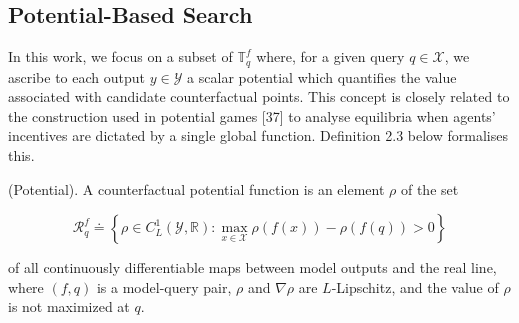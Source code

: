 \subsection*{Potential-Based Search}
In this work, we focus on a subset of $\mathbb{T}_{q}^{f}$ where, for a given query $q \in \mathcal{X}$, we ascribe to each output $y \in \mathcal{Y}$ a scalar potential which quantifies the value associated with candidate counterfactual points. This concept is closely related to the construction used in potential games [37] to analyse equilibria when agents' incentives are dictated by a single global function. Definition 2.3 below formalises this.
\begin{definition}
(Potential). A counterfactual potential function is an element $\rho$ of the set

$$
\mathcal{R}_{q}^{f} \doteq\left\{\rho \in C_{L}^{1}(\mathcal{Y}, \mathbb{R}): \max _{x \in \mathcal{X}} \rho(f(x))-\rho(f(q))>0\right\}
$$

of all continuously differentiable maps between model outputs and the real line, where $(f, q)$ is a model-query pair, $\rho$ and $\nabla \rho$ are $L$-Lipschitz, and the value of $\rho$ is not maximized at $q$.
\end{definition}